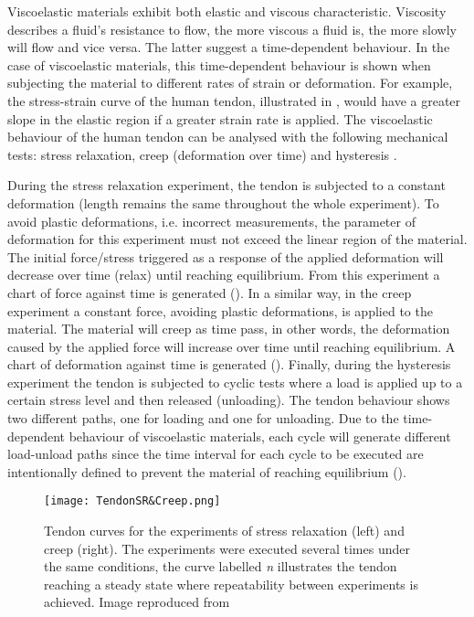Viscoelastic materials exhibit both elastic and viscous characteristic. Viscosity describes a fluid's resistance to flow, the more viscous a fluid is, the more slowly will flow and vice versa. The latter suggest a time-dependent behaviour. In the case of viscoelastic materials, this time-dependent behaviour is shown when subjecting the material to different rates of strain or deformation. For example, the stress-strain curve of the human tendon, illustrated in , would have a greater slope in the elastic region if a greater strain rate is applied. The viscoelastic behaviour of the human tendon can be analysed with the following mechanical tests: stress relaxation, creep (deformation over time) and hysteresis \cite{nordin2001basic}.

During the stress relaxation experiment, the tendon is subjected to a constant deformation (length remains the same throughout the whole experiment). To avoid plastic deformations, i.e. incorrect measurements, the parameter of deformation for this experiment must not exceed the linear region of the material. The initial force/stress triggered as a response of the applied deformation will decrease over time (relax) until reaching equilibrium. From this experiment a chart of force against time is generated (). In a similar way, in the creep experiment a constant force, avoiding plastic deformations, is applied to the material. The material will creep as time pass, in other words, the deformation caused by the applied force will increase over time until reaching equilibrium. A chart of deformation against time is generated (). Finally, during the hysteresis experiment the tendon is subjected to cyclic tests where a load is applied up to a certain stress level and then released (unloading). The tendon behaviour shows two different paths, one for loading and one for unloading. Due to the time-dependent behaviour of viscoelastic materials, each cycle will generate different load-unload paths since the time interval for each cycle to be executed are intentionally defined to prevent the material of reaching equilibrium ().

\begin{figure}[htb!]
    \centering
    \texttt{[image: TendonSR\&Creep.png]}
    \caption{Tendon curves for the experiments of stress relaxation (left) and creep (right). The experiments were executed several times under the same conditions, the curve labelled \textit{n} illustrates the tendon reaching a steady state where repeatability between experiments is achieved. Image reproduced from \cite{maurel1998biomechanical} }
    \label{fig:tendonSR_Creep}
\end{figure}

